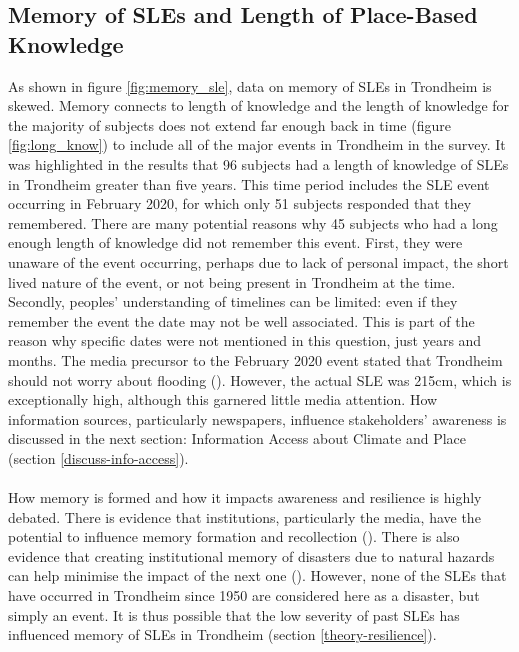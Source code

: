 \subsection{Memory of SLEs and Length of Place-Based Knowledge}\label{discuss-memory}
As shown in figure \ref{fig:memory_sle}, data on memory of SLEs in Trondheim is skewed. Memory connects to length of knowledge and the length of knowledge for the majority of subjects does not extend far enough back in time (figure \ref{fig:long_know}) to include all of the major events in Trondheim in the survey. It was highlighted in the results that 96 subjects had a length of knowledge of SLEs in Trondheim greater than five years. This time period includes the SLE event occurring in February 2020, for which only 51 subjects responded that they remembered. There are many potential reasons why 45 subjects who had a long enough length of knowledge did not remember this event. First, they were unaware of the event occurring, perhaps due to lack of personal impact, the short lived nature of the event, or not being present in Trondheim at the time. Secondly, peoples' understanding of timelines can be limited: even if they remember the event the date may not be well associated. This is part of the reason why specific dates were not mentioned in this question, just years and months. The media precursor to the February 2020 event stated that Trondheim should not worry about flooding (\cite{baisotti_danger_2020}). However, the actual SLE was 215cm, which is exceptionally high, although this garnered little media attention. How information sources, particularly newspapers, influence stakeholders' awareness is discussed in the next section: Information Access about Climate and Place (section \ref{discuss-info-access}).
\paragraph{}
How memory is formed and how it impacts awareness and resilience is highly debated. There is evidence that institutions, particularly the media, have the potential to influence memory formation and recollection (\cite{de_guttry_expiry_2022}). There is also evidence that creating institutional memory of disasters due to natural hazards can help minimise the impact of the next one (\cite{de_guttry_expiry_2022}). However, none of the SLEs that have occurred in Trondheim since 1950 are considered here as a disaster, but simply an event. It is thus possible that the low severity of past SLEs has influenced memory of SLEs in Trondheim (section \ref{theory-resilience}). 
